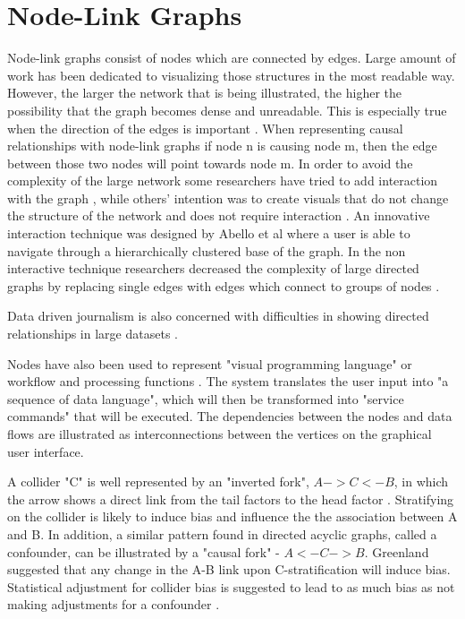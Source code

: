 \documentclass{l4proj}
\begin{document}
\section{Node-Link Graphs}

Node-link graphs consist of nodes which are connected by edges. Large amount of work has been dedicated to visualizing those structures in the most readable way. However, the larger the network that is being illustrated, the higher the possibility that the graph becomes dense and unreadable. This is especially true when the direction of the edges is important \cite{dwyer2013edge}. When representing causal relationships with node-link graphs if node n is causing node m, then the edge between those two nodes will point towards node m. In order to avoid the complexity of the large network some researchers have tried to add interaction with the graph \cite{gansner2005topological}, while others' intention was to create visuals that do not change the structure of the network and does not require interaction \cite{dwyer2013edge}. An innovative interaction technique was designed by Abello et al \cite{abello2006ask} where a user is able to navigate through a hierarchically clustered base of the graph. In the non interactive technique researchers decreased the complexity of large directed graphs by replacing single edges with edges which connect to groups of nodes \cite{dwyer2013edge}.  

Data driven journalism is also concerned with difficulties in showing directed relationships in large datasets \cite{niederer2015survey}.

Nodes have also been used to represent "visual programming language" or workflow and processing functions \cite{thattai2016systems}. The system translates the user input into "a sequence of data language", which will then be transformed into "service commands" that will be executed. The dependencies between the nodes and data flows are illustrated as interconnections between the vertices on the graphical user interface. 

A collider "C" is well represented by an "inverted fork", $A->C<-B$, in which the arrow shows a direct link from the tail factors to the head factor \cite{greenland2003quantifying}. Stratifying on the collider is likely to induce bias and influence the the association between A and B. In addition, a similar pattern found in directed acyclic graphs, called a confounder, can be illustrated by a "causal fork" - $A<-C-> B$. Greenland \cite{greenland2003quantifying} suggested that any change in the A-B link upon C-stratification will induce bias. Statistical adjustment for collider bias is suggested to lead to as much bias as not making adjustments for a confounder  \cite{janszky2010janus}. 
\end{document}
